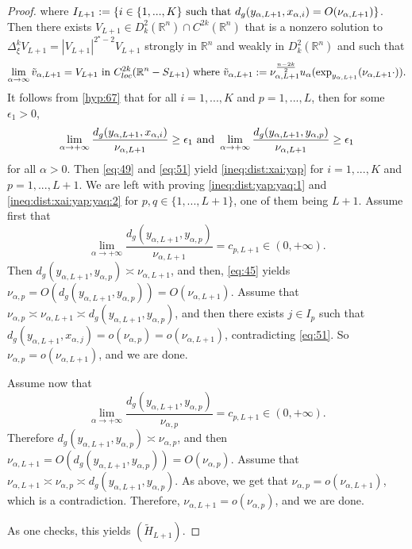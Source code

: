 \documentclass[reqno]{amsart}
\def \rn {\mathbb{R}^n}
\def \eps {\epsilon}
\def \crit {2^\star}
\def \ua {u_\alpha}
\def \xai {x_{\alpha,i}}
\def \xaj {x_{\alpha,j}}
\def \nap {\nu_{\alpha,p}}
\def \yap {y_{\alpha,p}}
\begin{document}
\begin{proof}
where $I_{L+1}:=\{ i\in\{1,...,K\}\hbox{ such that }d_g(y_{\alpha, L+1},\xai)=O(\nu_{\alpha, L+1})\}$. Then there exists $V_{L+1}\in D_k^2(\rn)\cap C^{2k}(\rn)$ that is a nonzero solution to $\Delta_\xi^kV_{L+1}=|V_{L+1}|^{\crit-2}V_{L+1}$ strongly in $\rn$ and weakly in $D_k^2(\rn)$ and such that
\begin{equation*}
\lim_{\alpha\to\infty}\tilde{v}_{\alpha, L+1}=V_{L+1}\hbox{ in }C^{2k}_{loc}(\rn-S_{L+1})\hbox{ where }\tilde{v}_{\alpha, L+1}:=\nu_{\alpha, L+1}^{\frac{n-2k}{2}}\ua(\hbox{exp}_{y_{\alpha, L+1}}(\nu_{\alpha, L+1} \cdot)).
\end{equation*}
It follows from \eqref{hyp:67} that for all $i=1,...,K$ and $p=1,...,L$, then for some $\eps_1>0$,
\begin{equation}\label{eq:51}
\lim_{\alpha\to +\infty}\frac{d_g(y_{\alpha, L+1},\xai)}{\nu_{\alpha, L+1}}\geq \eps_1\hbox{ and }\lim_{\alpha\to +\infty}\frac{d_g(y_{\alpha, L+1},\yap)}{\nu_{\alpha, L+1}}\geq \eps_1 
\end{equation}
for all $\alpha>0$. Then \eqref{eq:49} and \eqref{eq:51} yield  \eqref{ineq:dist:xai:yap} for $i=1,...,K$ and $p=1,...,L+1$. We are left with proving \eqref{ineq:dist:yap:yaq:1}  and \eqref{ineq:dist:xai:yap:yaq:2}  for $p,q\in\{1,...,L+1\}$, one of them being $L+1$. Assume first that
$$\lim_{\alpha\to +\infty}\frac{d_g(y_{\alpha, L+1},\yap)}{\nu_{\alpha, L+1}}=c_{p, L+1}\in (0,+\infty).$$
Then $d_g(y_{\alpha, L+1},\yap)\asymp \nu_{\alpha, L+1}$, and then,   \eqref{eq:45} yields $\nap=O(d_g(y_{\alpha, L+1},\yap))=O( \nu_{\alpha, L+1})$. Assume that $\nap\asymp \nu_{\alpha, L+1}\asymp d_g(y_{\alpha, L+1},\yap)$, and then  there exists $j\in I_p$ such that $d_g(y_{\alpha,L+1},\xaj)=o(\nap)=o(\nu_{\alpha, L+1})$, contradicting  \eqref{eq:51}. So $\nap=o( \nu_{\alpha, L+1})$, and we are done. 

\smallskip\noindent  Assume now that
$$\lim_{\alpha\to +\infty}\frac{d_g(y_{\alpha, L+1},\yap)}{\nu_{\alpha, p}}=c_{p, L+1}\in (0,+\infty).$$
Therefore $d_g(y_{\alpha, L+1},\yap)\asymp \nu_{\alpha, p}$, and then $\nu_{\alpha, L+1}=O(d_g(y_{\alpha, L+1},\yap))=O( \nu_{\alpha, p})$. Assume that $\nu_{\alpha, L+1}\asymp \nu_{\alpha, p}\asymp d_g(y_{\alpha, L+1},\yap)$. As above, we get that $\nap=o( \nu_{\alpha, L+1})$, which is a contradiction. Therefore,  $\nu_{\alpha, L+1}=o( \nu_{\alpha, p})$, and we are done.

\smallskip\noindent As one checks, this yields $(\tilde{H}_{L+1})$. \end{proof}
\end{document}
